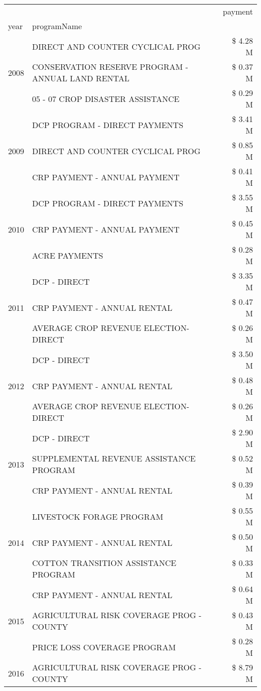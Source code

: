 \begin{tabular}{llr}
\toprule
 &  & payment \\
year & programName &  \\
\midrule
\multirow[t]{3}{*}{2008} & DIRECT AND COUNTER CYCLICAL PROG & \$ 4.28 M \\
 & CONSERVATION RESERVE PROGRAM - ANNUAL LAND RENTAL & \$ 0.37 M \\
 & 05 - 07 CROP DISASTER ASSISTANCE & \$ 0.29 M \\
\cline{1-3}
\multirow[t]{3}{*}{2009} & DCP PROGRAM - DIRECT PAYMENTS & \$ 3.41 M \\
 & DIRECT AND COUNTER CYCLICAL PROG & \$ 0.85 M \\
 & CRP PAYMENT - ANNUAL PAYMENT & \$ 0.41 M \\
\cline{1-3}
\multirow[t]{3}{*}{2010} & DCP PROGRAM - DIRECT PAYMENTS & \$ 3.55 M \\
 & CRP PAYMENT - ANNUAL PAYMENT & \$ 0.45 M \\
 & ACRE PAYMENTS & \$ 0.28 M \\
\cline{1-3}
\multirow[t]{3}{*}{2011} & DCP - DIRECT & \$ 3.35 M \\
 & CRP PAYMENT - ANNUAL RENTAL & \$ 0.47 M \\
 & AVERAGE CROP REVENUE ELECTION-DIRECT & \$ 0.26 M \\
\cline{1-3}
\multirow[t]{3}{*}{2012} & DCP - DIRECT & \$ 3.50 M \\
 & CRP PAYMENT - ANNUAL RENTAL & \$ 0.48 M \\
 & AVERAGE CROP REVENUE ELECTION-DIRECT & \$ 0.26 M \\
\cline{1-3}
\multirow[t]{3}{*}{2013} & DCP - DIRECT & \$ 2.90 M \\
 & SUPPLEMENTAL REVENUE ASSISTANCE PROGRAM & \$ 0.52 M \\
 & CRP PAYMENT - ANNUAL RENTAL & \$ 0.39 M \\
\cline{1-3}
\multirow[t]{3}{*}{2014} & LIVESTOCK FORAGE PROGRAM & \$ 0.55 M \\
 & CRP PAYMENT - ANNUAL RENTAL & \$ 0.50 M \\
 & COTTON TRANSITION ASSISTANCE PROGRAM & \$ 0.33 M \\
\cline{1-3}
\multirow[t]{3}{*}{2015} & CRP PAYMENT - ANNUAL RENTAL & \$ 0.64 M \\
 & AGRICULTURAL RISK COVERAGE PROG - COUNTY & \$ 0.43 M \\
 & PRICE LOSS COVERAGE PROGRAM & \$ 0.28 M \\
\cline{1-3}
\multirow[t]{3}{*}{2016} & AGRICULTURAL RISK COVERAGE PROG - COUNTY & \$ 8.79 M \\

\end{tabular}
